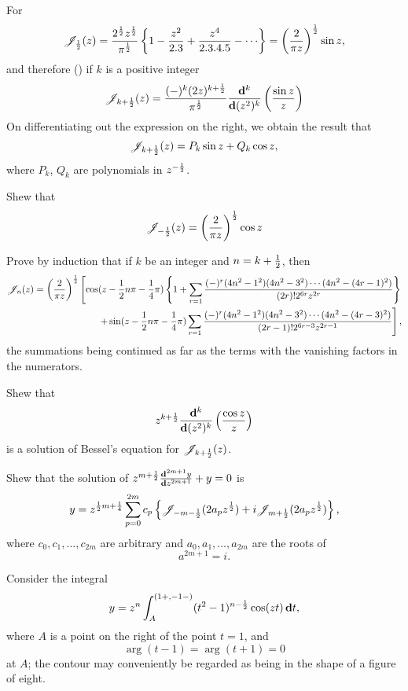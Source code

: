 For 
$$
\besJ_{\half}(z) 
= 
\frac{2^{\half} z^{\half}}{\pi^{\half}}
\thebrace{ 1
  - \frac{z^{2}}{2.3}
  + \frac{z^{4}}{2.3.4.5}
  - \cdots
}
= \theparen{ \frac{2}{\pi z}  }^{\half}
\sin z,
$$
and therefore () if $k$ is a
positive integer
$$
\mathscr{J}_{k+\frac{1}{2}}(z)
=
\frac{(-)^{k} (2z)^{k+\frac{1}{2}}}{\pi^{\frac{1}{2}}}
\frac{\mathbf{d}^{k}}{\mathbf{d} (z^{2})^{k}}
\left(  \frac{\sin z}{z}   \right)
$$
On differentiating out the expression on the right, we obtain the
result that
$$
\mathscr{J}_{k+\frac{1}{2}}(z) = P_{k} \sin z + Q_{k} \cos z,
$$
where $P_{k}$, $Q_{k}$ are polynomials in $z^{-\frac{1}{2}}$.
\begin{wandwexample}
  Shew that
  $$
  \mathscr{J}_{-\frac{1}{2}}(z) = \left(  \frac{2}{\pi z} \right)^{\frac{1}{2}} \cos z
  $$
\end{wandwexample}
% 
% 
\begin{wandwexample}
  Prove by induction that if $k$ be an integer and $n = k + \frac{1}{2}$,
  then
  \begin{align*}
    \mathscr{J}_{n}(z)
    =
    \left( \frac{2}{\pi z} \right)^{\frac{1}{2}}
    \left[
      \cos(z - \frac{1}{2} n \pi - \frac{1}{4}\pi)
      \left\{ 
        1
        +
        \sum_{r=1}
        \frac{(-)^{r} (4n^{2}-1^{2})(4n^{2}-3^{2})\cdots(4n^{2}-(4r-1)^{2})}{(2r)! 2^{6r} z^{2r}}
       \right\}
    \right.
    \\
    \left.
      +
      \sin(z - \frac{1}{2} n \pi - \frac{1}{4}\pi)
      \sum_{r=1}
      \frac{(-)^{r} (4n^{2}-1^{2})(4n^{2}-3^{2})\cdots(4n^{2}-(4r-3)^{2})}{(2r-1)!
        2^{6r-3} z^{2r-1}}
    \right],
  \end{align*}
  the summations being continued as far as the terms with the
  vanishing factors in the numerators.
\end{wandwexample}
\begin{wandwexample}
  Shew that
  $$
  z^{k+\frac{1}{2}} \frac{\mathbf{d}^{k}}{\mathbf{d} (z^{2})^{k}} \left( \frac{\cos z}{z} \right)
  $$
  is a solution of Bessel's equation for $\mathscr{J}_{k+\frac{1}{2}}(z)$.
\end{wandwexample}
\begin{wandwexample}
  Shew that the solution of
  $
  z^{m+\frac{1}{2}} \frac{\mathbf{d}^{2m+1} y}{\mathbf{d} z^{2m+1}} + y = 0
  $
  is
  $$
  y
  =
  z^{\frac{1}{2} m + \frac{1}{4}}
  \sum_{p=0}^{2m}
  c_{p}
  \left\{  \mathscr{J}_{-m-\frac{1}{2}}(2a_{p}z^{\frac{1}{2}}) + i\mathscr{J}_{m+\frac{1}{2}}(2a_{p}z^{\frac{1}{2}}) \right\},
  $$
  where
  $c_{0},c_{1},\ldots,c_{2m}$ are arbitrary and
  $a_{0},a_{1},\ldots,a_{2m}$ are the roots of
  $$a^{2m+1}=i.
  $$
\end{wandwexample}
Consider the integral
$$
y = z^{n} \int_{A}^{(1+,-1-)} (t^{2}-1)^{n-\frac{1}{2}} \cos(zt) \, \mathbf{d} t,
$$
where $A$ is a point on the right of the point $t=1$, and
$$
\arg(t-1) = \arg(t+1) = 0
$$
at $A$; the contour may conveniently be regarded as being in the shape
of a figure of eight.

